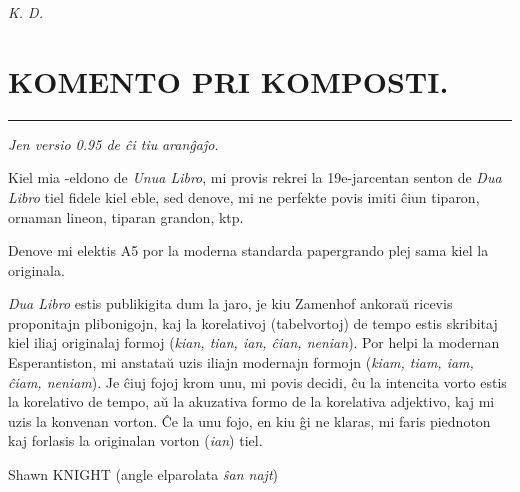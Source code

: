 \documentclass[ngerman,12pt,twoside]{book}
\newcommand{\laversio}{0.95}
\begin{document}
\begin{flushright}
\it K. D. 
\end{flushright}

\begin{center}
\end{center}
\titlespacing*{\chapter}{0pt}{0pt}{0pt}
%
%
\fancyhead[C]{--- \thepage ---}
\titleformat{\chapter}[display]{\centering\sansfont}{\chaptertitlename}{0pt}{\large}
\chapter*{KOMENTO PRI KOMPOSTI.}

\begin{center}
\rule[0.5ex]{0.5\textwidth}{0.4pt}

\emph{Jen versio \laversio{} de ĉi tiu} \XeLaTeX{} \emph{aranĝaĵo.}
\end{center}

\small Kiel mia \XeLaTeX{}-eldono de \emph{Unua Libro}, mi provis rekrei la 19e-jarcentan \glqq{}senton\grqq{} de \emph{Dua Libro} tiel fidele kiel eble, sed denove, mi ne perfekte povis imiti ĉiun tiparon, ornaman lineon, tiparan grandon, ktp.

Denove mi elektis A5 por la moderna standarda papergrando plej sama kiel la originala.

\emph{Dua Libro} estis publikigita dum la jaro, je kiu Zamenhof ankoraŭ ricevis proponitajn plibonigojn, kaj la korelativoj (tabelvortoj) de tempo estis skribitaj kiel iliaj originalaj formoj (\emph{kian, tian, ian, ĉian, nenian}). Por helpi la modernan Esperantiston, mi anstataŭ uzis iliajn modernajn formojn (\emph{kiam, tiam, iam, ĉiam, neniam}).  Je ĉiuj fojoj krom unu, mi povis decidi, ĉu la intencita vorto estis la korelativo de tempo, aŭ la akuzativa formo de la korelativa adjektivo, kaj mi uzis la konvenan vorton.  Ĉe la unu fojo, en kiu ĝi ne klaras, mi faris piednoton kaj forlasis la originalan vorton (\emph{ian}) tiel. 

\vspace{1ex}

{\setlength{\parindent}{0em}
Shawn KNIGHT (angle elparolata \emph{ŝan najt})\\
\hodiau}


\end{document}
